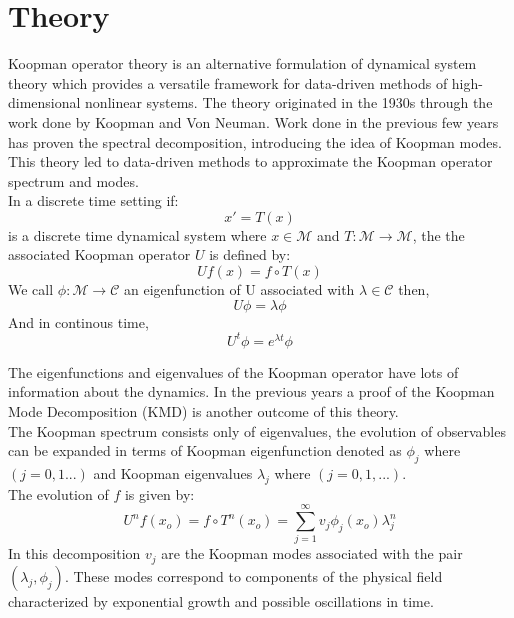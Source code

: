 \documentclass{article}
\begin{document}
\section*{Theory}
Koopman operator theory is an alternative formulation of dynamical system theory which provides a versatile framework for data-driven methods of high-dimensional nonlinear systems. The theory originated in the 1930s through the work done by Koopman and Von Neuman. Work done in the previous few years has proven the spectral decomposition, introducing the idea of Koopman modes. This theory led to data-driven methods to approximate the Koopman operator spectrum and modes.\\

In a discrete time setting if:
\begin{equation}
x' = T(x)
\end{equation}
is a discrete time dynamical system where $x\in \mathcal{M}$ and $T: \mathcal{M} \to \mathcal{M}$, the the associated Koopman operator $U$ is defined by:
\begin{equation}
Uf(x)=f\circ T(x)
\end{equation}
We call $\phi: \mathcal{M}\to \mathcal{C}$ an eigenfunction of U associated with $\lambda \in \mathcal{C}$ then,
\begin{equation}
U\phi =\lambda \phi
\end{equation}
And in continous time,
\begin{equation}
U^t\phi = e^{\lambda t}\phi
\end{equation}

The eigenfunctions and eigenvalues of the Koopman operator have lots of information about the dynamics. In the previous years a proof of the Koopman Mode Decomposition (KMD) is another outcome of this theory.\\

The Koopman spectrum consists only of eigenvalues, the evolution of observables can be expanded in terms of Koopman eigenfunction denoted as $\phi_j$ where $(j=0,1...)$ and Koopman eigenvalues $\lambda_j$ where $(j=0,1,...)$.\\
The evolution of $f$ is given by:
\begin{equation}
U^nf(x_o) = f \circ T^n(x_o) = \sum_{j=1}^{\infty} v_j\phi_j(x_o)\lambda_{j}^{n} 
\end{equation}
In this decomposition $v_j$ are the Koopman modes associated with the pair $(\lambda_j,\phi_j)$. These modes correspond to components of the physical field characterized by exponential growth and possible oscillations in time.\\
\end{document}
